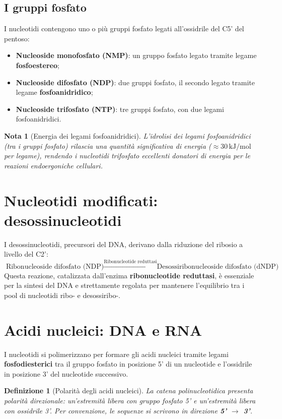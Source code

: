 \documentclass[12pt,a4paper]{report}
\newtheorem{definizione}{Definizione}[section]
\newtheorem{nota}{Nota}[section]
\begin{document}
\subsection{I gruppi fosfato}
I nucleotidi contengono uno o più gruppi fosfato legati all'ossidrile del C5' del pentoso:
\begin{itemize}
\item \textbf{Nucleoside monofosfato (NMP)}: un gruppo fosfato legato tramite legame \textbf{fosfoestereo};
\item \textbf{Nucleoside difosfato (NDP)}: due gruppi fosfato, il secondo legato tramite legame \textbf{fosfoanidridico};
\item \textbf{Nucleoside trifosfato (NTP)}: tre gruppi fosfato, con due legami fosfoanidridici.
\end{itemize}
\begin{nota}[Energia dei legami fosfoanidridici]
L'idrolisi dei legami fosfoanidridici (tra i gruppi fosfato) rilascia una quantità significativa di energia ($\approx 30\,\mathrm{kJ/mol}$ per legame), rendendo i nucleotidi trifosfato eccellenti donatori di energia per le reazioni endoergoniche cellulari.
\end{nota}

\section{Nucleotidi modificati: desossinucleotidi}
I desossinucleotidi, precursori del DNA, derivano dalla riduzione del ribosio a livello del C2':
\[
\text{Ribonucleoside difosfato (NDP)} \xrightarrow{\text{Ribonucleotide reduttasi}} \text{Desossiribonucleoside difosfato (dNDP)}
\]
Questa reazione, catalizzata dall'enzima \textbf{ribonucleotide reduttasi}, è essenziale per la sintesi del DNA e strettamente regolata per mantenere l'equilibrio tra i pool di nucleotidi ribo- e desossiribo-.

\section{Acidi nucleici: DNA e RNA}
I nucleotidi si polimerizzano per formare gli acidi nucleici tramite legami \textbf{fosfodiesterici} tra il gruppo fosfato in posizione 5' di un nucleotide e l'ossidrile in posizione 3' del nucleotide successivo.
\begin{definizione}[Polarità degli acidi nucleici]
La catena polinucleotidica presenta polarità direzionale: un'estremità libera con gruppo fosfato 5' e un'estremità libera con ossidrile 3'. Per convenzione, le sequenze si scrivono in direzione \textbf{5' $\rightarrow$ 3'}.
\end{definizione}
\end{document}
